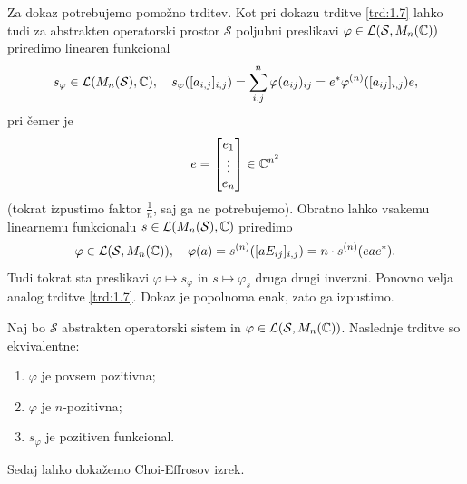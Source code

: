 Za dokaz potrebujemo pomožno trditev.
Kot pri dokazu trditve \ref{trd:1.7} lahko tudi za
abstrakten operatorski prostor $\mathcal{S}$
poljubni preslikavi $\varphi \in \mathcal{L}(\mathcal{S}, M_n (\mathbb C))$
priredimo linearen funkcional 
$$s_\varphi \in \mathcal{L}(M_n (\mathcal{S}), \mathbb C),\quad s_\varphi ([a_{i, j}]_{i, j}) = \sum_{i, j} ^n \varphi(a_{ij})_{ij} = e^* \varphi^{(n)} ([a_{ij}]_{i, j}) e,$$
pri čemer je $$e = \begin{bmatrix}
    e_1 \\ \vdots \\ e_n
\end{bmatrix} \in \mathbb C^{n^2}$$
(tokrat izpustimo faktor $\frac{1}{n}$, saj ga ne potrebujemo).
Obratno lahko vsakemu linearnemu funkcionalu $s \in \mathcal{L}(M_n (\mathcal{S}), \mathbb C)$
priredimo $$\varphi \in \mathcal{L}(\mathcal{S}, M_n (\mathbb C)),\quad \varphi (a) = s^{(n)} ([a E_{ij}]_{i, j}) = n \cdot s^{(n)} (e a e^*).$$
Tudi tokrat sta preslikavi 
$\varphi \mapsto s_{\varphi}$ in $s \mapsto \varphi_s$ druga drugi inverzni.
Ponovno velja analog trditve \ref{trd:1.7}. 
Dokaz je popolnoma enak, zato ga izpustimo.

\begin{trditev}
    Naj bo $\mathcal{S}$ abstrakten operatorski sistem in $\varphi \in \mathcal{L}(\mathcal{S}, M_n (\mathbb C))$. Naslednje trditve so ekvivalentne:
    \begin{enumerate}
        \item $\varphi$ je povsem pozitivna;
        \item $\varphi$ je $n$-pozitivna;
        \item $s_\varphi$ je pozitiven funkcional.
    \end{enumerate}
\end{trditev}

Sedaj lahko dokažemo Choi-Effrosov izrek.

